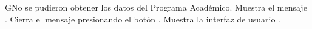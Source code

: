 \begin{UCtrayectoriaA}{G}{No se pudieron obtener los datos del Programa Académico.}
    \UCpaso Muestra el mensaje .
    \UCpaso[\UCactor] Cierra el mensaje presionando el botón .
    \UCpaso Muestra la interfaz de usuario .
\end{UCtrayectoriaA}